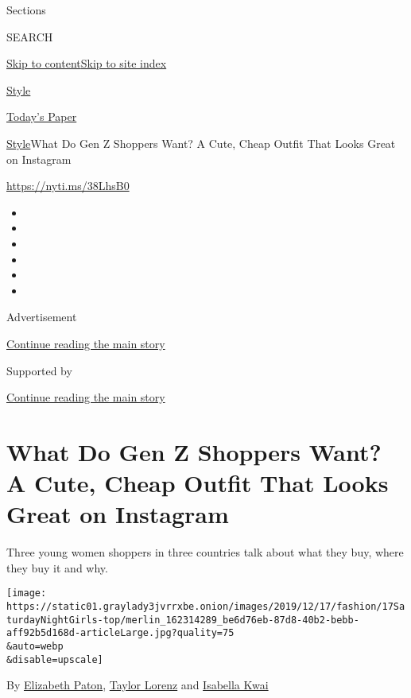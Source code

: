 Sections

SEARCH

\protect\hyperlink{site-content}{Skip to
content}\protect\hyperlink{site-index}{Skip to site index}

\href{https://www.nytimes3xbfgragh.onion/section/style}{Style}

\href{https://myaccount.nytimes3xbfgragh.onion/auth/login?response_type=cookie\&client_id=vi}{}

\href{https://www.nytimes3xbfgragh.onion/section/todayspaper}{Today's
Paper}

\href{/section/style}{Style}\textbar{}What Do Gen Z Shoppers Want? A
Cute, Cheap Outfit That Looks Great on Instagram

\href{https://nyti.ms/38LhsB0}{https://nyti.ms/38LhsB0}

\begin{itemize}
\item
\item
\item
\item
\item
\item
\end{itemize}

Advertisement

\protect\hyperlink{after-top}{Continue reading the main story}

Supported by

\protect\hyperlink{after-sponsor}{Continue reading the main story}

\hypertarget{what-do-gen-z-shoppers-want-a-cute-cheap-outfit-that-looks-great-on-instagram}{%
\section{What Do Gen Z Shoppers Want? A Cute, Cheap Outfit That Looks
Great on
Instagram}\label{what-do-gen-z-shoppers-want-a-cute-cheap-outfit-that-looks-great-on-instagram}}

Three young women shoppers in three countries talk about what they buy,
where they buy it and why.

\texttt{[image: https://static01.graylady3jvrrxbe.onion/images/2019/12/17/fashion/17SaturdayNightGirls-top/merlin\_162314289\_be6d76eb-87d8-40b2-bebb-aff92b5d168d-articleLarge.jpg?quality=75\\\&auto=webp\\\&disable=upscale]}

By
\href{https://www.nytimes3xbfgragh.onion/by/elizabeth-paton}{Elizabeth
Paton},
\href{https://www.nytimes3xbfgragh.onion/by/taylor-lorenz}{Taylor
Lorenz} and
\href{https://www.nytimes3xbfgragh.onion/by/isabella-kwai}{Isabella
Kwai}

